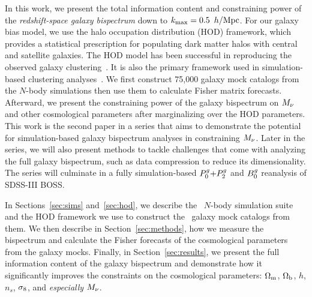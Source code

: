 In this work, we present the total information content and constraining power
of the {\em redshift-space galaxy bispectrum} down to $k_{\rm max}= 0.5~\,h/\mathrm{Mpc}$. For our galaxy
bias model, we use the halo occupation distribution (HOD) framework, which provides a
statistical prescription for populating dark matter halos with central and satellite
galaxies. The HOD model has been successful in reproducing the observed galaxy
clustering~\citep[\emph{e.g.}][]{zheng2005, leauthaud2012, tinker2013, zentner2016, vakili2019}. 
It is also the primary framework used in simulation-based clustering
analyses~\citep[\eg][]{mcclintock2018, zhai2019, lange2019, wibking2019}. 
We first construct 75,000 galaxy mock catalogs from the \quij $N$-body
simulations then use them to calculate Fisher matrix forecasts. Afterward, we
present the constraining power of the galaxy bispectrum on $M_\nu$ and other 
cosmological parameters after marginalizing over the HOD parameters. This work
is the second paper in a series that aims to demonstrate the potential for
simulation-based galaxy bispectrum analyses in constraining $M_\nu$. Later in
the series, we will also present methods to tackle challenges that come with
analyzing the full galaxy bispectrum, such as data compression to reduce its
dimensionality. The series will culminate in a fully simulation-based $P^g_0{+}P^g_2$ and
$B^g_0$ reanalysis of SDSS-III BOSS. 

In Sections~\ref{sec:sims} and~\ref{sec:hod}, we describe the \quij~$N$-body simulation 
suite and the HOD framework we use to construct the \molino~galaxy mock catalogs from them. 
We then describe in Section~\ref{sec:methods}, how we measure the bispectrum and
calculate the Fisher forecasts of the cosmological parameters from the galaxy
mocks. Finally, in Section~\ref{sec:results}, we present the full information
content of the galaxy bispectrum and demonstrate how it significantly improves
the constraints on the cosmological parameters: $\Omega_{\rm m}$, $\Omega_{\rm b}$, $h$, $n_s$,
$\sigma_8$, and {\em especially} $M_\nu$. 
